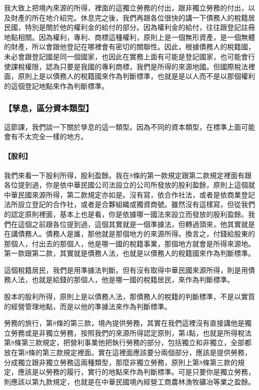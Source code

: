 \documentclass[oneside,sub3section]{ctexbook}
\let\oldparagraph\paragraph
\renewcommand{\paragraph}[1]{\oldparagraph{#1}\mbox{}}
\begin{document}
我大致上把境內來源的所得，裡面的這獨立勞務的付出，跟非獨立勞務的付出，以及財產的所在地介紹完。休息完之後，我們再跟各位很快的講一下債務人的稅籍居民國，特別是關於他的權利金的給付的部分。因為權利金的給付，往往跟登記註冊地點相關。因為權利，專利、商標這種權利，原則上是一個無形資產，是一個無體的財產，所以會跟他登記在哪裡會有密切的關聯性。因此，根據債務人的稅籍國，未必會跟登記國是同一個國家，也因此在實務上面有可能是登記國家，也可能會行使課稅權限，認為只要是我國的專利商標，我們是所得的來源地國。但國際稅法裡面，原則上是以債務人的稅籍國來作為判斷標準，也就是是以人而不是以那個權利的這個登記地點來作為判斷標準。

\hypertarget{ux5b73ux606fux5340ux5206ux8cc7ux672cux985eux578b}{%
\subsubsection{【孳息，區分資本類型】}\label{ux5b73ux606fux5340ux5206ux8cc7ux672cux985eux578b}}

這節課，我們談一下關於孳息的這一類型。因為不同的資本類型，在標準上面可能會有不太完全一樣的地方。

\hypertarget{ux80a1ux5229}{%
\paragraph{【股利】}\label{ux80a1ux5229}}

我們來看一下股利所得，股利盈餘。我在8條的第一款規定跟第二款規定裡面有跟各位提到過，你是依中華民國公司法設立的公司所發放的股利盈餘，原則上這個就中華民國來源所得，第二款規定亦如是。沒有寫，依合作社法，或者是依商業登記法所設立登記的合作社，或者是合夥組織或獨資商號。雖然沒有這樣寫，但從我們的認定原則裡面，基本上也是看，你是依據哪一國法來設立而發放的股利盈餘。我們在這個之前跟各位提到過，這個其實就是一個準據法，但轉過頭來，他其實就是在講債務人。債務人是誰，那他就是那個地方的來源所得。換言之，付錢給股東的那個人，付出去的那個人，他是哪一國的稅籍事業，那個地方就會是所得來源地。第一款跟第二款，其實就是債務人法，也就是以債務人的稅籍國來作為判斷標準。

這個稅籍居民，我們是用準據法判斷。但有沒有取得中華民國來源所得，則是用債務人法，也就是給錢的那個人，他是哪一國的稅籍居民，來作為判斷標準。

股本的股利所得，原則上是以債務人法，那債務人的稅籍的判斷標準，不是以實質的經營管理地點，而是以他的準據法來作為判斷標準。

勞務的旅行，第8條的第三款，境內提供勞務，其實在我們這裡沒有直接講他是獨立勞務或是非獨立勞務，按照我們的來源所得認定原則，第4點，也就是所得稅法第8條第三款規定，把營利事業他把執行勞務的部分，包括獨立和非獨立，全部都放在第8條的第三款規定裡面。實在這裡面應該要分兩個部分，應該是提供勞務，分成獨立跟非獨立勞務這兩種類型，那麼非獨立勞務，原則上第8條第三款的規定，應該是以勞務的履行，實行的地點來作為判斷標準。可是只要你是獨立勞務，則應該以第九款規定，也就是在中華民國境內經營工商農林漁牧礦冶等業之盈餘。
\end{document}
